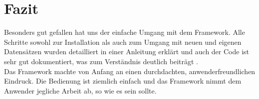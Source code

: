 \section{Fazit}
Besonders gut gefallen hat uns der einfache Umgang mit dem Framework. Alle Schritte sowohl zur Installation als auch zum Umgang mit neuen und eigenen Datensätzen wurden detailliert in einer Anleitung erklärt und auch der Code ist sehr gut dokumentiert, was zum Verständnis deutlich beiträgt \cite{nnunetGithub}.\\
Das Framework machte von Anfang an einen durchdachten, anwenderfreundlichen Eindruck. Die Bedienung ist ziemlich einfach und das Framework nimmt dem Anwender jegliche Arbeit ab, so wie es sein sollte.
